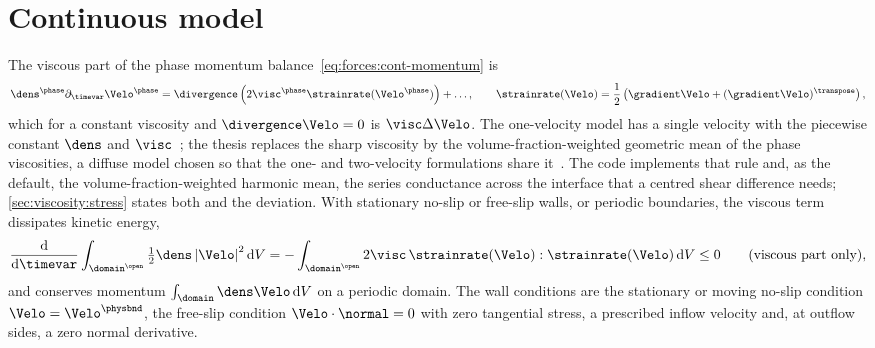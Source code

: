 \section{Continuous model}\label{sec:viscosity:continuous}
The viscous part of the phase momentum
balance~\cref{eq:forces:cont-momentum} is
\begin{equation}\label{eq:viscosity:cont}
  \dens^{\phase}\partial_\timevar\Velo^{\phase}=\divergence\roundpar{2\visc^{\phase}\strainrate(\Velo^{\phase})}+\dots,
  \qquad
  \strainrate(\Velo)=\half\roundpar{\gradient\Velo+(\gradient\Velo)^{\transpose}},
\end{equation}
which for a constant viscosity and $\divergence\Velo=0$ is $\visc\Delta\Velo$.
The one-velocity model has a single velocity with the piecewise constant
$\dens$ and $\visc$~; the thesis replaces the sharp
viscosity by the volume-fraction-weighted geometric mean of the phase
viscosities, a diffuse model chosen so that the one- and two-velocity
formulations share it~. The code implements that rule and, as
the default, the volume-fraction-weighted harmonic mean, the series
conductance across the interface that a centred shear difference needs;
\cref{sec:viscosity:stress} states both and the deviation. With stationary no-slip or free-slip
walls, or periodic boundaries, the viscous term dissipates kinetic energy,
\begin{equation}\label{eq:viscosity:dissipation}
  \frac{\dd}{\dd\timevar}\integral{\domain^{\open}}{\tfrac12\dens\abs{\Velo}^2}{V}
  =-\integral{\domain^{\open}}{2\visc\,\strainrate(\Velo):\strainrate(\Velo)}{V}\le0
  \qquad(\text{viscous part only}),
\end{equation}
and conserves momentum $\integral{\domain}{\dens\Velo}{V}$ on a periodic
domain. The wall conditions are the stationary or moving no-slip
condition $\Velo=\Velo^{\physbnd}$, the free-slip condition
$\Velo\cdot\normal=0$ with zero tangential stress, a prescribed inflow
velocity and, at outflow sides, a zero normal derivative.

